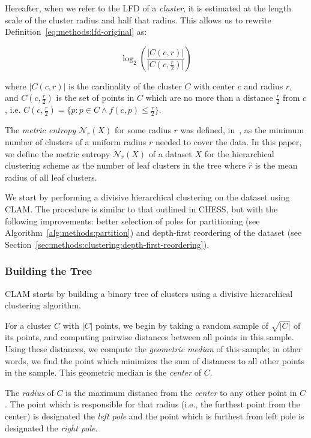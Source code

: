 Hereafter, when we refer to the LFD of a \textit{cluster}, it is estimated at the length scale of the cluster radius and half that radius.
This allows us to rewrite Definition~\ref{eq:methods:lfd-original} as:

\begin{equation}
    \log_2 \left( \frac{|C(c, r)|}{|C(c, \frac{r}{2})|} \right)
    \label{eq:methods:lfd-simplified}
\end{equation}

where $|C(c, r)|$ is the cardinality of the cluster $C$ with center $c$ and radius $r$, and $C(c, \frac{r}{2})$ is the set of points in $C$ which are no more than a distance $\frac{r}{2}$ from $c$, i.e. $C(c, \frac{r}{2}) = \{p : p \in C \land f(c, p) \leq \frac{r}{2}\}$.

The \textit{metric entropy} $\mathcal{N}_{r}(X)$ for some radius $r$ was defined, in~\cite{yu2015entropy}, as the minimum number of clusters of a uniform radius $r$ needed to cover the data.
In this paper, we define the metric entropy $\mathcal{N}_{\hat{r}}(X)$ of a dataset $X$ for the hierarchical clustering scheme as the number of leaf clusters in the tree where $\hat{r}$ is the mean radius of all leaf clusters.

We start by performing a divisive hierarchical clustering on the dataset using CLAM.
The procedure is similar to that outlined in CHESS, but with the following improvements:
better selection of poles for partitioning (see Algorithm~\ref{alg:methods:partition}) and depth-first reordering of the dataset (see Section~\ref{sec:methods:clustering:depth-first-reordering}).


\subsubsection{Building the Tree}
\label{sec:methods:clustering:building-the-tree}

CLAM starts by building a binary tree of clusters using a divisive hierarchical clustering algorithm.

For a cluster $C$ with $|C|$ points, we begin by taking a random sample of $\sqrt{|C|}$ of its points, and computing pairwise distances between all points in this sample.
Using these distances, we compute the \textit{geometric median} of this sample; in other words, we find the point which minimizes the sum of distances to all other points in the sample.
This geometric median is the \textit{center} of $C$.

The \textit{radius} of $C$ is the maximum distance from the \textit{center} to any other point in $C$.
The point which is responsible for that radius (i.e., the furthest point from the center) is designated the \textit{left pole} and the point which is furthest from left pole is designated the \textit{right pole}.

